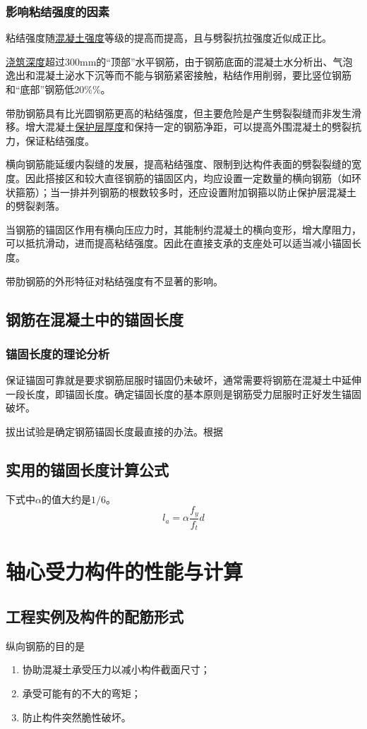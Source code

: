 \documentclass{article}
\begin{document}
\subsubsection{影响粘结强度的因素}
\par 粘结强度随\underline{混凝土强度}等级的提高而提高，且与劈裂抗拉强度近似成正比。
\par \underline{浇筑深度}超过300mm的“顶部”水平钢筋，由于钢筋底面的混凝土水分析出、气泡逸出和混凝土泌水下沉等而不能与钢筋紧密接触，粘结作用削弱，要比竖位钢筋和“底部”钢筋低20\%\%。
\par 带肋钢筋具有比光圆钢筋更高的粘结强度，但主要危险是产生劈裂裂缝而非发生滑移。增大混凝土\underline{保护层厚度}和保持一定的钢筋净距，可以提高外围混凝土的劈裂抗力，保证粘结强度。
\par 横向钢筋能延缓内裂缝的发展，提高粘结强度、限制到达构件表面的劈裂裂缝的宽度。因此搭接区和较大直径钢筋的锚固区内，均应设置一定数量的横向钢筋（如环状箍筋）；当一排并列钢筋的根数较多时，还应设置附加钢箍以防止保护层混凝土的劈裂剥落。
\par 当钢筋的锚固区作用有横向压应力时，其能制约混凝土的横向变形，增大摩阻力，可以抵抗滑动，进而提高粘结强度。因此在直接支承的支座处可以适当减小锚固长度。
\par 带肋钢筋的外形特征对粘结强度有不显著的影响。
\subsection{钢筋在混凝土中的锚固长度}
\subsubsection{锚固长度的理论分析}
\par 保证锚固可靠就是要求钢筋屈服时锚固仍未破坏，通常需要将钢筋在混凝土中延伸一段长度，即锚固长度。确定锚固长度的基本原则是钢筋受力屈服时正好发生锚固破坏。
\par 拔出试验是确定钢筋锚固长度最直接的办法。根据
\subsection{实用的锚固长度计算公式}
\par 下式中$\alpha$的值大约是$1/6$。
$$l_a=\alpha \frac{f_y}{f_t}d$$
\section{轴心受力构件的性能与计算}
\subsection{工程实例及构件的配筋形式}
\par 纵向钢筋的目的是\begin{enumerate}
      \item 协助混凝土承受压力以减小构件截面尺寸；
      \item 承受可能有的不大的弯矩；
      \item 防止构件突然脆性破坏。
\end{enumerate}
\end{document}
